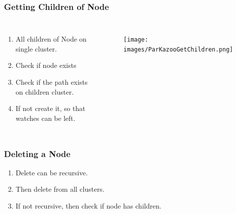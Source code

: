 \documentclass[10pt, compress]{beamer}
\begin{document}
\begin{frame}[fragile]
    \frametitle{Getting Children of Node}
    \begin{columns}[onlytextwidth]
        \begin{enumerate}
            \item All children of Node on single cluster.
            \item Check if node exists
            \item Check if the path exists on children cluster.
            \item If not create it, so that watches can be left.
        \end{enumerate}
        \begin{figure}[ht!]
            \centering
            \texttt{[image: images/ParKazooGetChildren.png]}
        \end{figure}
    \end{columns}
\end{frame}

\begin{frame}[fragile]
    \frametitle{Deleting a Node}
    \begin{enumerate}
        \item Delete can be recursive.
        \item Then delete from all clusters.
        \item If not recursive, then check if node has children.
    \end{enumerate}
\end{frame}
\end{document}
